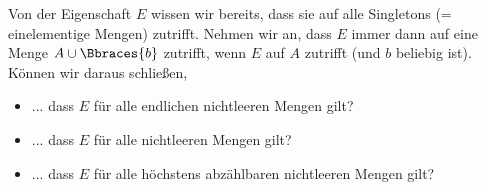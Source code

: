
\begin{exercise}[2]

Von der Eigenschaft $E$ wissen wir bereits, dass sie auf alle Singletons (= einelementige Mengen) zutrifft.
Nehmen wir an, dass $E$ immer dann auf eine Menge $A \cup \Bbraces{b}$ zutrifft, wenn $E$ auf $A$ zutrifft (und $b$ beliebig ist).
Können wir daraus schließen,

\begin{itemize}
    \item ... dass $E$ für alle endlichen nichtleeren Mengen gilt?
    \item ... dass $E$ für alle nichtleeren Mengen gilt?
    \item ... dass $E$ für alle höchstens abzählbaren nichtleeren Mengen gilt?
\end{itemize}

\end{exercise}


